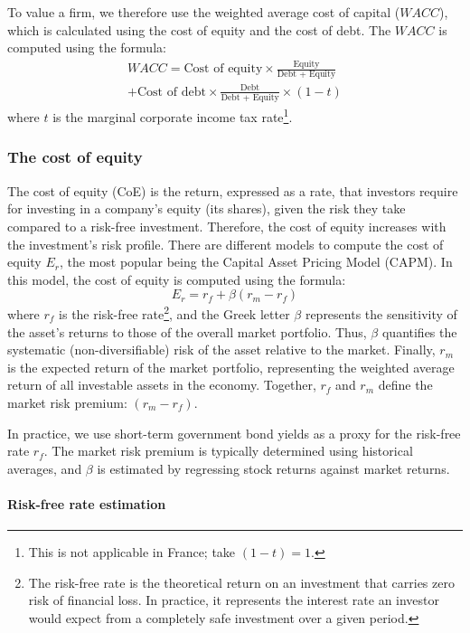 To value a firm, we therefore use the weighted average cost of capital ($WACC$), which is calculated using the cost of equity and the cost of debt. The $WACC$ is computed using the formula: 
\begin{multline}
        WACC = \text{Cost of equity}  \times \frac{\text{Equity}}{\text{Debt + Equity}} \\+ \text{Cost of debt} \times \frac{\text{Debt}}{\text{Debt + Equity}} \times (1-t)
\end{multline}
where $t$ is the marginal corporate income tax rate\footnote{This is not applicable in France; take $(1-t) = 1$.}.


\subsubsection{The cost of equity}

The cost of equity (CoE) is the return, expressed as a rate, that investors require for investing in a company's equity (its shares), given the risk they take compared to a risk-free investment. Therefore, the cost of equity increases with the investment's risk profile. There are different models to compute the cost of equity $E_r$, the most popular being the Capital Asset Pricing Model (CAPM). In this model, the cost of equity is computed using the formula: 
\begin{equation}
    E_r = r_f + \beta(r_m - r_f)
\end{equation}
where $r_f$ is the risk-free rate\footnote{The risk-free rate is the theoretical return on an investment that carries zero risk of financial loss.
In practice, it represents the interest rate an investor would expect from a completely safe investment over a given period.}, and the Greek letter $\beta$ represents the sensitivity of the asset's returns to those of the overall market portfolio. Thus, $\beta$ quantifies the systematic (non-diversifiable) risk of the asset relative to the market. Finally, $r_m$ is the expected return of the market portfolio, representing the weighted average return of all investable assets in the economy. Together, $r_f$ and $r_m$ define the market risk premium: $(r_m - r_f)$. 

In practice, we use short-term government bond yields as a proxy for the risk-free rate $r_f$. The market risk premium is typically determined using historical averages, and $\beta$ is estimated by regressing stock returns against market returns.

\paragraph{Risk-free rate estimation}

